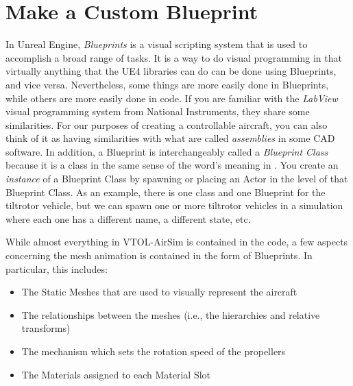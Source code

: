 
\section{Make a Custom Blueprint}\label{sec:blueprint}
In Unreal Engine, \textit{Blueprints} is a visual scripting system that is used to accomplish a broad range of tasks. It is a way to do visual programming in that virtually anything that the UE4 \CC libraries can do can be done using Blueprints, and vice versa. Nevertheless, some things are more easily done in Blueprints, while others are more easily done in \CC code. If you are familiar with the \textit{LabView} visual programming system from National Instruments, they share some similarities. For our purposes of creating a controllable aircraft, you can also think of it as having similarities with what are called \textit{assemblies} in some CAD software. In addition, a Blueprint is interchangeably called a \textit{Blueprint Class} because it is a class in the same sense of the word's meaning in \CCd. You create an \textit{instance} of a Blueprint Class by spawning or placing an Actor in the level of that Blueprint Class. As an example, there is one  \CC class and one  Blueprint for the tiltrotor vehicle, but we can spawn one or more tiltrotor vehicles in a simulation where each one has a different name, a different state, etc.

While almost everything in VTOL-AirSim is contained in the \CC code, a few aspects concerning the mesh animation is contained in the form of Blueprints. In particular, this includes:
\begin{itemize}
    \item The Static Meshes that are used to visually represent the aircraft
    \item The relationships between the meshes (i.e., the hierarchies and relative transforms)
    \item The mechanism which sets the rotation speed of the propellers
    \item The Materials assigned to each Material Slot
\end{itemize}

